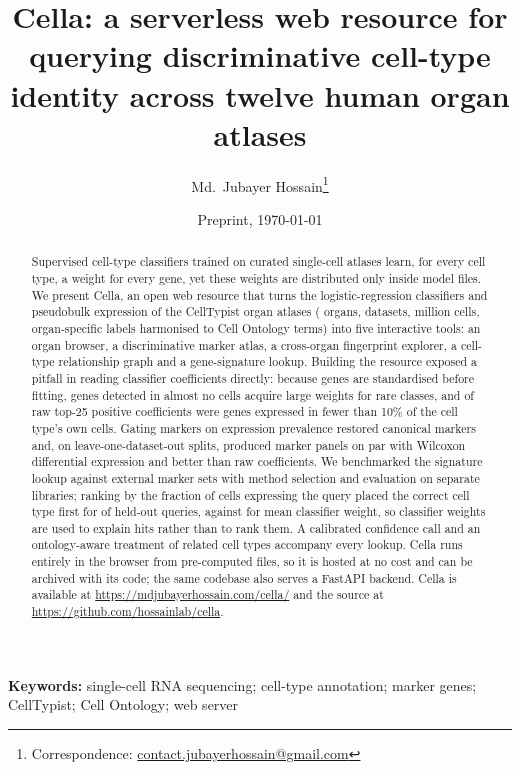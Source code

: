 \documentclass[11pt]{article}
\title{\textbf{Cella: a serverless web resource for querying discriminative cell-type identity across twelve human organ atlases}}
\author[1,2]{Md.~Jubayer Hossain\thanks{Correspondence: \href{mailto:contact.jubayerhossain@gmail.com}{contact.jubayerhossain@gmail.com}}}
\affil[1]{Center for Health Innovation, Research, Action, and Learning -- Bangladesh, Dhaka, Bangladesh}
\affil[2]{DeepBio, Dhaka, Bangladesh}
\date{Preprint, \today}
\newcommand{\cella}{Cella}
\begin{document}
\maketitle

\begin{abstract}
\noindent
Supervised cell-type classifiers trained on curated single-cell atlases learn, for every cell type, a weight for every gene, yet these weights are distributed only inside model files. We present \cella{}, an open web resource that turns the logistic-regression classifiers and pseudobulk expression of the CellTypist organ atlases (\nOrgans{} organs, \nDatasets{} datasets, \nCells{} million cells, \nLabels{} organ-specific labels harmonised to \nCLTerms{} Cell Ontology terms) into five interactive tools: an organ browser, a discriminative marker atlas, a cross-organ fingerprint explorer, a cell-type relationship graph and a gene-signature lookup. Building the resource exposed a pitfall in reading classifier coefficients directly: because genes are standardised before fitting, genes detected in almost no cells acquire large weights for rare classes, and \gateFracAll{} of raw top-25 positive coefficients were genes expressed in fewer than 10\% of the cell type's own cells. Gating markers on expression prevalence restored canonical markers and, on \pnSplits{} leave-one-dataset-out splits, produced marker panels on par with Wilcoxon differential expression and better than raw coefficients. We benchmarked the signature lookup against \lkScored{} external marker sets with method selection and evaluation on separate libraries; ranking by the fraction of cells expressing the query placed the correct cell type first for \lkExprTopOne{} of held-out queries, against \lkWmeanTopOne{} for mean classifier weight, so classifier weights are used to explain hits rather than to rank them. A calibrated confidence call and an ontology-aware treatment of related cell types accompany every lookup. \cella{} runs entirely in the browser from pre-computed files, so it is hosted at no cost and can be archived with its code; the same codebase also serves a FastAPI backend. \cella{} is available at \url{https://mdjubayerhossain.com/cella/} and the source at \url{https://github.com/hossainlab/cella}.
\end{abstract}

\noindent\textbf{Keywords:} single-cell RNA sequencing; cell-type annotation; marker genes; CellTypist; Cell Ontology; web server

\linenumbers
\end{document}
